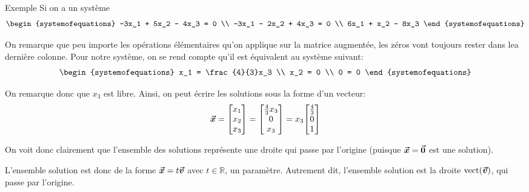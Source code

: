 \documentclass{article}
\begin{document}
\begin{parag}{Exemple}
    Si on a un système
    \[\begin{systemofequations}
    -3x_1 + 5x_2 - 4x_3 = 0 \\
    -3x_1 - 2x_2 + 4x_3 = 0 \\
    6x_1 + x_2 - 8x_3
    \end{systemofequations}\]

    On remarque que peu importe les opérations élémentaires qu'on applique sur la matrice augmentée, les zéros vont toujours rester dans lea dernière colonne. Pour notre système, on se rend compte qu'il est équivalent au système suivant:
    \[\begin{systemofequations}
    x_1 = \frac{4}{3}x_3 \\
    x_2 = 0 \\
    0 = 0
    \end{systemofequations}\]

    On remarque donc que $x_3$ est libre. Ainsi, on peut écrire les solutions sous la forme d'un vecteur:
    \[\bvec{x} = \begin{bmatrix} x_1 \\ x_2 \\ x_3 \end{bmatrix} = \begin{bmatrix} \frac{4}{3}x_3 \\  0\\  x_3 \end{bmatrix} = x_3 \begin{bmatrix} \frac{4}{3} \\ 0 \\ 1 \end{bmatrix} \]

    On voit donc clairement que l'ensemble des solutions représente une droite qui passe par l'origine (puisque $\bm{\protect\vec{x}} = \bm{\protect\vec{0}}$ est une solution).

    L'ensemble solution est donc de la forme $\bm{\protect\vec{x}} = t \bm{\protect\vec{v}}$ avec $t \in \mathbb{R}$, un paramètre. Autrement dit, l'ensemble solution est la droite $\vect\left(\bvec{v}\right)$, qui passe par l'origine.
\end{parag}
\end{document}

